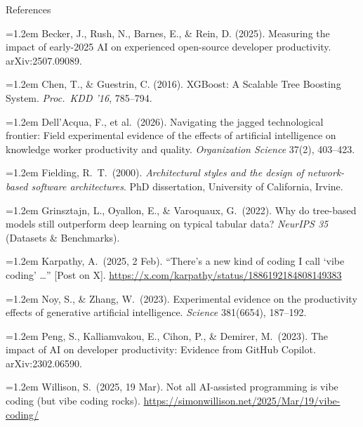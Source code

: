 \documentclass[aspectratio=169,11pt]{beamer}
\newcommand{\refitem}[1]{\hangindent=1.2em\hangafter=1 #1\par\vspace{2pt}}
\begin{document}
\begin{frame}{References}
  \vspace{2pt}
  {\scriptsize
  \refitem{Becker, J., Rush, N., Barnes, E., \& Rein, D. (2025). Measuring the impact of early-2025 AI on experienced open-source developer productivity. arXiv:2507.09089.}
  \refitem{Chen, T., \& Guestrin, C. (2016). XGBoost: A Scalable Tree Boosting System. \emph{Proc.\ KDD '16}, 785--794.}
  \refitem{Dell'Acqua, F., et al.\ (2026). Navigating the jagged technological frontier: Field experimental evidence of the effects of artificial intelligence on knowledge worker productivity and quality. \emph{Organization Science} 37(2), 403--423.}
  \refitem{Fielding, R.\ T.\ (2000). \emph{Architectural styles and the design of network-based software architectures}. PhD dissertation, University of California, Irvine.}
  \refitem{Grinsztajn, L., Oyallon, E., \& Varoquaux, G.\ (2022). Why do tree-based models still outperform deep learning on typical tabular data? \emph{NeurIPS 35} (Datasets \& Benchmarks).}
  \refitem{Karpathy, A.\ (2025, 2 Feb). ``There's a new kind of coding I call `vibe coding' \ldots'' [Post on X]. \url{https://x.com/karpathy/status/1886192184808149383}}
  \refitem{Noy, S., \& Zhang, W.\ (2023). Experimental evidence on the productivity effects of generative artificial intelligence. \emph{Science} 381(6654), 187--192.}
  \refitem{Peng, S., Kalliamvakou, E., Cihon, P., \& Demirer, M.\ (2023). The impact of AI on developer productivity: Evidence from GitHub Copilot. arXiv:2302.06590.}
  \refitem{Willison, S.\ (2025, 19 Mar). Not all AI-assisted programming is vibe coding (but vibe coding rocks). \url{https://simonwillison.net/2025/Mar/19/vibe-coding/}}}
\end{frame}
\end{document}
